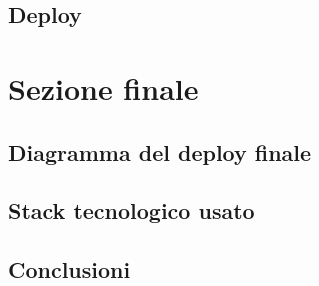 \documentclass{article}
\begin{document}
\subsection{Deploy}

\section{Sezione finale}
\subsection{Diagramma del deploy finale}

\subsection{Stack tecnologico usato}

\subsection{Conclusioni}
\end{document}
